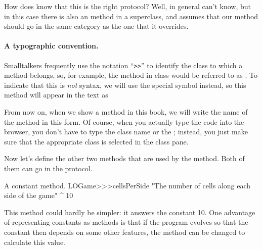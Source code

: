 \documentclass[a4paper,10pt,twoside]{book}
\begin{document}
{
How does \pharo{} know that this is the right protocol?  Well, in general \pharo{} can't know, but in this case there is also an  method in a superclass, and \pharo assumes that our  method should go in the same category as the one that it overrides.


\paragraph{A typographic convention.} Smalltalkers frequently use the notation ``\verb|>>|'' to identify the class to which a method belongs, so, for example, the  method in class  would be referred to as .
To indicate that this is \emph{not} \st syntax, we will use the special symbol \ct{>>>} instead, so this method will appear in the text as 

From now on, when we show a method in this book, we will write the name of the method in this form.  Of course, when you actually type the code into the browser, you don't have to type the class name or the \ct{>>>}; instead, you just make sure that the appropriate class is selected in the class pane.  

Now let's define the other two methods that are used by the  method. Both of them can go in the  protocol.

\begin{method}[sbegamecellsperside]{A constant method.}
LOGame>>>cellsPerSide
   "The number of cells along each side of the game"
   ^ 10
\end{method}

This method could hardly be simpler: it answers the constant 10.  One advantage of representing constants as methods is that if the program evolves so that the constant then depends on some other features, the method can be changed to calculate this value.

}
\end{document}
